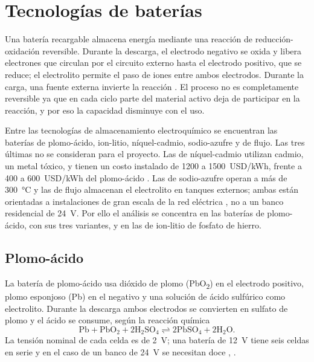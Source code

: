 \section{Tecnologías de baterías}\label{sec:tecnologias}

Una batería recargable almacena energía mediante una reacción de reducción-oxidación reversible. Durante la descarga, el electrodo negativo se oxida y libera electrones que circulan por el circuito externo hasta el electrodo positivo, que se reduce; el electrolito permite el paso de iones entre ambos electrodos. Durante la carga, una fuente externa invierte la reacción \cite{linden}. El proceso no es completamente reversible ya que en cada ciclo parte del material activo deja de participar en la reacción, y por eso la capacidad disminuye con el uso.

Entre las tecnologías de almacenamiento electroquímico se encuentran las baterías de plomo-ácido, ion-litio, níquel-cadmio, sodio-azufre y de flujo. Las tres últimas no se consideran para el proyecto. Las de níquel-cadmio utilizan cadmio, un metal tóxico, y tienen un costo instalado de 1200 a \SI{1500}{USD/kWh}, frente a 400 a \SI{600}{USD/kWh} del plomo-ácido \cite{may2018}. Las de sodio-azufre operan a más de \SI{300}{\celsius} y las de flujo almacenan el electrolito en tanques externos; ambas están orientadas a instalaciones de gran escala de la red eléctrica \cite{may2018}, no a un banco residencial de \SI{24}{V}. Por ello el análisis se concentra en las baterías de plomo-ácido, con sus tres variantes, y en las de ion-litio de fosfato de hierro.

\subsection{Plomo-ácido}

La batería de plomo-ácido usa dióxido de plomo (PbO\textsubscript{2}) en el electrodo positivo, plomo esponjoso (Pb) en el negativo y una solución de ácido sulfúrico como electrolito. Durante la descarga ambos electrodos se convierten en sulfato de plomo y el ácido se consume, según la reacción química
\begin{equation}
\mathrm{Pb + PbO_2 + 2H_2SO_4 \rightleftharpoons 2PbSO_4 + 2H_2O}.
\end{equation}
La tensión nominal de cada celda es de \SI{2}{V}; una batería de \SI{12}{V} tiene seis celdas en serie y en el caso de un banco de \SI{24}{V} se necesitan doce \cite{linden}, \cite{pavlov}.

